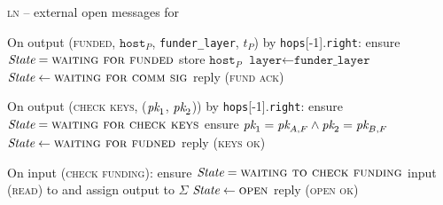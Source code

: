 \begin{center}
  \begin{processbox}{\textsc{ln} -- external open messages for \bob}
    \ \\
    \begin{algorithmic}[1]
      \State On output (\textsc{funded}, $\texttt{host}_P$,
      \texttt{funder\_layer}, $t_P$) by \texttt{hops}[-1].\texttt{right}:
      \label{code:ln:bob:funded}
      \Indent
        \State ensure $\itistate = \textsc{waiting for funded}$
        \State store $\texttt{host}_P$ 
        \label{code:ln:bob:host}
        \State $\texttt{layer} \gets \texttt{funder\_layer}$
        \State $\itistate \gets \textsc{waiting for comm sig}$
        \State reply (\textsc{fund ack})
      \EndIndent
      \Statex

      \State On output (\textsc{check keys}, ($\textit{pk}_{1}$, $\textit{pk}_{2}$)) by
      \texttt{hops}[-1].\texttt{right}:
      \Indent
        \State ensure $\itistate = \textsc{waiting for check keys}$
        \State ensure $\textit{pk}_{1} = \textit{pk}_{A, F} \wedge \textit{pk}_{2} = \textit{pk}_{B, F}$
        \State $\itistate \gets \textsc{waiting for fudned}$
        \State reply (\textsc{keys ok})
      \EndIndent
      \Statex

      \State On input (\textsc{check funding}):
      \Indent
        \State ensure $\itistate = \textsc{waiting to check funding}$
        \State input (\textsc{read}) to \ledger and assign output to $\Sigma$
          \State $\itistate \gets \textsc{open}$
          \label{code:ln:bob:state-open}
          \State reply (\textsc{open ok})
        \EndIf
      \EndIndent
    \end{algorithmic}
  \end{processbox}
  \label{code:ln:bob}
\end{center} \ \\

